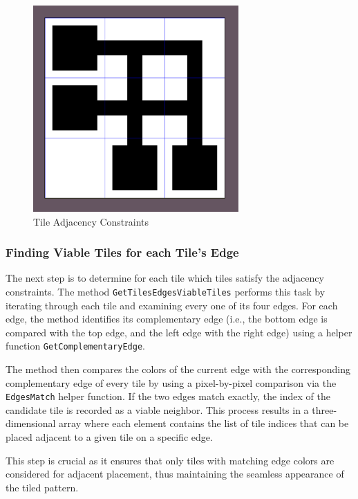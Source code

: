 \documentclass[a4paper, 12pt, one column, aas_macros]{article}
\begin{document}
\begin{figure}[htbp]
  \centering
  \includegraphics[width=0.7\textwidth]{images/wfc-tile-adjacency-constraints.png}
  \caption{Tile Adjacency Constraints}
  \label{fig:wfc-tile-adjacency-constraints}
\end{figure}

\subsubsection{Finding Viable Tiles for each Tile's Edge}
The next step is to determine for each tile which tiles satisfy the adjacency constraints. The method \texttt{GetTilesEdgesViableTiles} performs this task by iterating through each tile and examining every one of its four edges. For each edge, the method identifies its complementary edge (i.e., the bottom edge is compared with the top edge, and the left edge with the right edge) using a helper function \texttt{GetComplementaryEdge}.

The method then compares the colors of the current edge with the corresponding complementary edge of every tile by using a pixel-by-pixel comparison via the \texttt{EdgesMatch} helper function. If the two edges match exactly, the index of the candidate tile is recorded as a viable neighbor. This process results in a three-dimensional array where each element contains the list of tile indices that can be placed adjacent to a given tile on a specific edge.

This step is crucial as it ensures that only tiles with matching edge colors are considered for adjacent placement, thus maintaining the seamless appearance of the tiled pattern.
\end{document}
